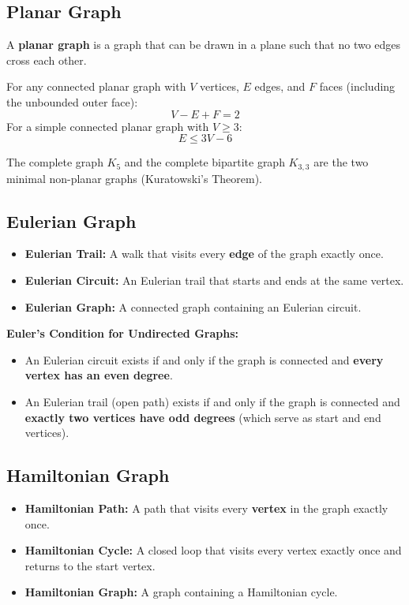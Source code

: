 \subsection{Planar Graph}
A \textbf{planar graph} is a graph that can be drawn in a plane such that no two edges cross each other.

\begin{tcolorbox}[title=\textbf{Euler's Formula for Connected Planar Graphs}]
For any connected planar graph with $V$ vertices, $E$ edges, and $F$ faces (including the unbounded outer face):
\[
\boxed{V - E + F = 2}
\]
For a simple connected planar graph with $V \geq 3$:
\[
E \leq 3V - 6
\]
\end{tcolorbox}
The complete graph $K_5$ and the complete bipartite graph $K_{3,3}$ are the two minimal non-planar graphs (Kuratowski's Theorem).

\subsection{Eulerian Graph}
\begin{itemize}
    \item \textbf{Eulerian Trail:} A walk that visits every \textbf{edge} of the graph exactly once.
    \item \textbf{Eulerian Circuit:} An Eulerian trail that starts and ends at the same vertex.
    \item \textbf{Eulerian Graph:} A connected graph containing an Eulerian circuit.
\end{itemize}

\textbf{Euler's Condition for Undirected Graphs:}
\begin{itemize}
    \item An Eulerian circuit exists if and only if the graph is connected and \textbf{every vertex has an even degree}.
    \item An Eulerian trail (open path) exists if and only if the graph is connected and \textbf{exactly two vertices have odd degrees} (which serve as start and end vertices).
\end{itemize}

\subsection{Hamiltonian Graph}
\begin{itemize}
    \item \textbf{Hamiltonian Path:} A path that visits every \textbf{vertex} in the graph exactly once.
    \item \textbf{Hamiltonian Cycle:} A closed loop that visits every vertex exactly once and returns to the start vertex.
    \item \textbf{Hamiltonian Graph:} A graph containing a Hamiltonian cycle.
\end{itemize}

